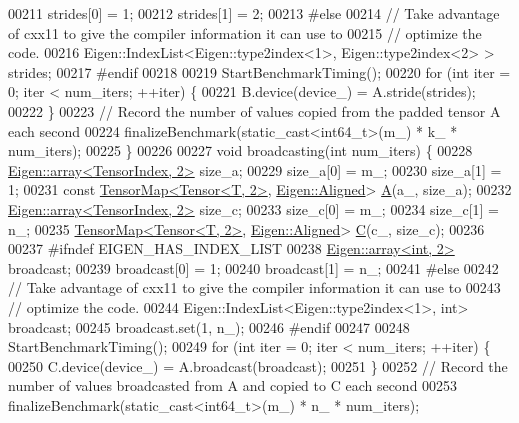 \begin{DoxyCode}
00211     strides[0] = 1;
00212     strides[1] = 2;
00213 \textcolor{preprocessor}{#else}
00214     \textcolor{comment}{// Take advantage of cxx11 to give the compiler information it can use to}
00215     \textcolor{comment}{// optimize the code.}
00216     Eigen::IndexList<Eigen::type2index<1>, Eigen::type2index<2> > strides;
00217 \textcolor{preprocessor}{#endif}
00218 
00219     StartBenchmarkTiming();
00220     \textcolor{keywordflow}{for} (\textcolor{keywordtype}{int} iter = 0; iter < num\_iters; ++iter) \{
00221       B.device(device\_) = A.stride(strides);
00222     \}
00223     \textcolor{comment}{// Record the number of values copied from the padded tensor A each second}
00224     finalizeBenchmark(static\_cast<int64\_t>(m\_) * k\_ * num\_iters);
00225   \}
00226 
00227   \textcolor{keywordtype}{void} broadcasting(\textcolor{keywordtype}{int} num\_iters) \{
00228     \hyperlink{class_eigen_1_1array}{Eigen::array<TensorIndex, 2>} size\_a;
00229     size\_a[0] = m\_;
00230     size\_a[1] = 1;
00231     \textcolor{keyword}{const} \hyperlink{class_eigen_1_1_tensor_map}{TensorMap<Tensor<T, 2>}, \hyperlink{group__enums_gga45fe06e29902b7a2773de05ba27b47a1ad37d4c71425bb286e9b4103830538fbf}{Eigen::Aligned}> 
      \hyperlink{group___core___module_class_eigen_1_1_matrix}{A}(a\_, size\_a);
00232     \hyperlink{class_eigen_1_1array}{Eigen::array<TensorIndex, 2>} size\_c;
00233     size\_c[0] = m\_;
00234     size\_c[1] = n\_;
00235     \hyperlink{class_eigen_1_1_tensor_map}{TensorMap<Tensor<T, 2>}, \hyperlink{group__enums_gga45fe06e29902b7a2773de05ba27b47a1ad37d4c71425bb286e9b4103830538fbf}{Eigen::Aligned}> 
      \hyperlink{group___core___module}{C}(c\_, size\_c);
00236 
00237 \textcolor{preprocessor}{#ifndef EIGEN\_HAS\_INDEX\_LIST}
00238     \hyperlink{class_eigen_1_1array}{Eigen::array<int, 2>} broadcast;
00239     broadcast[0] = 1;
00240     broadcast[1] = n\_;
00241 \textcolor{preprocessor}{#else}
00242     \textcolor{comment}{// Take advantage of cxx11 to give the compiler information it can use to}
00243     \textcolor{comment}{// optimize the code.}
00244     Eigen::IndexList<Eigen::type2index<1>, \textcolor{keywordtype}{int}> broadcast;
00245     broadcast.set(1, n\_);
00246 \textcolor{preprocessor}{#endif}
00247 
00248     StartBenchmarkTiming();
00249     \textcolor{keywordflow}{for} (\textcolor{keywordtype}{int} iter = 0; iter < num\_iters; ++iter) \{
00250       C.device(device\_) = A.broadcast(broadcast);
00251     \}
00252     \textcolor{comment}{// Record the number of values broadcasted from A and copied to C each second}
00253     finalizeBenchmark(static\_cast<int64\_t>(m\_) * n\_ * num\_iters);

\end{DoxyCode}
